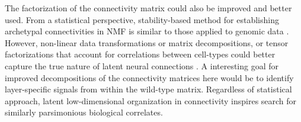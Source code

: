 The factorization of the connectivity matrix could also be improved and better used.
From a statistical perspective, stability-based method for establishing archetypal connectivities in NMF is similar to those applied to genomic data \cite{Wu2016-gg, Kotliar2019-yj}.
However, non-linear data transformations or matrix decompositions, or tensor factorizations that account for correlations between cell-types could better capture the true nature of latent neural connections \citep{Harris2016-fn}.
A interesting goal for improved decompositions of the connectivity matrices here would be to identify layer-specific signals from within the wild-type matrix.
Regardless of statistical approach, latent low-dimensional organization in connectivity inspires search for similarly parsimonious biological correlates.